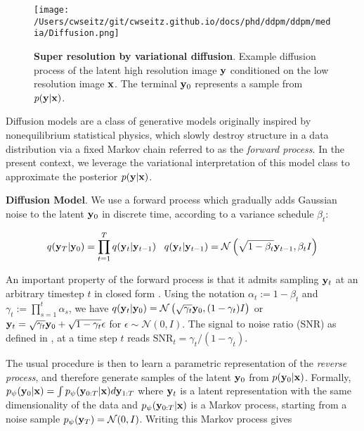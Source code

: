 \begin{figure}[t]
\texttt{[image: /Users/cwseitz/git/cwseitz.github.io/docs/phd/ddpm/ddpm/media/Diffusion.png]}
\caption{\textbf{Super resolution by variational diffusion}. Example diffusion process of the latent high resolution image $\bold{y}$ conditioned on the low resolution image $\bold{x}$. The terminal $\bold{y}_{0}$ represents a sample from $p(\bold{y}\lvert\bold{x})$.}
\label{fig:fig11}
\end{figure}

Diffusion models \parencite{Ho2020,Song2021} are a class of generative models originally inspired by nonequilibrium statistical physics, which slowly destroy structure in a data distribution via a fixed Markov chain referred to as the \emph{forward process}. In the present context, we leverage the variational interpretation of this model class \parencite{Kingma2021,Kingma2023} to approximate the posterior $p(\bold{y}\lvert\bold{x})$. 

\textbf{Diffusion Model}. We use a forward process which gradually adds Gaussian noise to the latent $\bold{y}_0$ in discrete time, according to a variance schedule $\beta_{t}$:

\begin{equation}
q(\bold{y}_{T}\lvert\bold{y}_{0}) = \prod_{t=1}^{T}q(\bold{y}_{t}\lvert\bold{y}_{t-1}) \;\;\; q(\bold{y}_{t}\lvert\bold{y}_{t-1}) = \mathcal{N}\left(\sqrt{1-\beta_{t}}\bold{y}_{t-1},\beta_t I\right)
\end{equation}

An important property of the forward process is that it admits sampling $\bold{y}_t$ at an arbitrary timestep $t$ in closed form \parencite{Ho2020}. Using the notation $\alpha_t := 1 - \beta_t$ and $\gamma_t := \prod_{s=1}^{t} \alpha_s$, we have $q(\bold{y}_t\lvert\bold{y}_0) = \mathcal{N} \left(\sqrt{\gamma_{t}} \bold{y}_{0}, (1 - \gamma_t)I \right)$ or $\bold{y}_{t} = \sqrt{\gamma_{t}}\bold{y}_{0} + \sqrt{1-\gamma_{t}}\bold{\epsilon}$ for $\epsilon \sim \mathcal{N}(0,I)$. The signal to noise ratio (SNR) as defined in \parencite{Kingma2023}, at a time step $t$ reads $\mathrm{SNR}_t = \gamma_{t}/(1-\gamma_{t})$.

The usual procedure is then to learn a parametric representation of the \emph{reverse process}, and therefore generate samples of the latent $\bold{y}_{0}$ from  $p(\bold{y}_{0}\lvert\bold{x})$. Formally, $p_{\psi}(\bold{y}_{0}\lvert\bold{x}) = \int p_{\psi}(\bold{y}_{0:T}\lvert\bold{x})d\bold{y}_{1:T}$ where $\bold{y}_{t}$ is a latent representation with the same dimensionality of the data and $p_{\psi}(\bold{y}_{0:T}\lvert\bold{x})$ is a Markov process, starting from a noise sample $p_{\psi}(\bold{y}_{T}) = \mathcal{N}(0,I)$. Writing this Markov process gives

